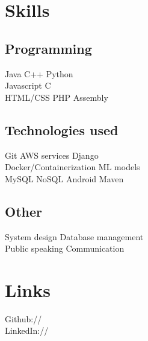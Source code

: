 \documentclass[]{resume_openfont}
\begin{document}
\begin{minipage}[t]{0.33\textwidth}

\section{Skills}
\subsection{Programming}
Java \textbullet{}   C++ \textbullet{} Python\\
Javascript \textbullet{} C \\ 
HTML/CSS \textbullet{} PHP \textbullet{} Assembly \\
\sectionsep

\subsection{Technologies used}
Git \textbullet{} AWS services \textbullet{} Django \\
Docker/Containerization \textbullet{} ML models \\
MySQL \textbullet{} NoSQL \textbullet{} Android \textbullet{} Maven \\
\sectionsep

\subsection{Other}
System design \textbullet{} Database management \\
Public speaking \textbullet{} Communication\\
\sectionsep


\section{Links} 
Github:// \href{https://github.com/thenamanpat}{} \\
LinkedIn://  \href{https://www.linkedin.com/in/thenamanpat}{} \\
\sectionsep

%
%

\end{minipage} 
\end{document}
